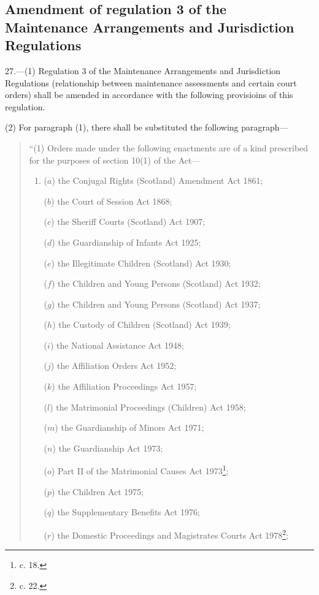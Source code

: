 \documentclass[12pt,a4paper]{article}
\begin{document}
\subsection[27. Amendment of regulation 3 of the Maintenance Arrangements and Jurisdiction Regulations]{Amendment of regulation 3 of the Maintenance Arrangements and Jurisdiction Regulations}

27.—(1) Regulation 3 of the Maintenance Arrangements and Jurisdiction Regulations (relationship between maintenance assessments and certain court orders) shall be amended in accordance with the following provisioins of this regulation.

(2) For paragraph (1), there shall be substituted the following paragraph—
\begin{quotation}
“(1) Orders made under the following enactments are of a kind prescribed for the purposes of section 10(1) of the Act—
\begin{enumerate}\item[]
($a$) the Conjugal Rights (Scotland) Amendment Act 1861;

($b$) the Court of Session Act 1868;

($c$) the Sheriff Courts (Scotland) Act 1907;

($d$) the Guardianship of Infants Act 1925;

($e$) the Illegitimate Children (Scotland) Act 1930;

($f$) the Children and Young Persons (Scotland) Act 1932;

($g$) the Children and Young Persons (Scotland) Act 1937;

($h$) the Custody of Children (Scotland) Act 1939;

($i$) the National Assistance Act 1948;

($j$) the Affiliation Orders Act 1952;

($k$) the Affiliation Proceedings Act 1957;

($l$) the Matrimonial Proceedings (Children) Act 1958;

($m$) the Guardianship of Minors Act 1971;

($n$) the Guardianship Act 1973;

($o$) Part II of the Matrimonial Causes Act 1973\footnote{ c. 18.};

($p$) the Children Act 1975;

($q$) the Supplementary Benefits Act 1976;

\begin{sloppypar}
($r$) the Domestic Proceedings and Magistrates Courts Act 1978\footnote{ c. 22.};
\end{sloppypar}


\end{enumerate}
\end{quotation}
\end{document}
